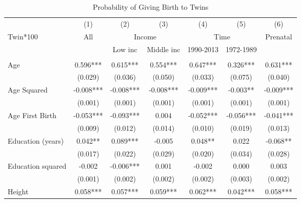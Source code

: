 \begin{landscape}\begin{table}[htpb!] 
\caption{Probability of Giving Birth to Twins} \label{TWINtab:twinreg1} 
\begin{center}\begin{tabular}{lcccccc} \toprule \toprule 
&(1)&(2)&(3)&(4)&(5)&(6)\\
Twin*100&All&\multicolumn{2}{c}{Income}&\multicolumn{2}{c}{Time}&Prenatal\\
 \cmidrule(r){3-4} \cmidrule(r){5-6} 
&&Low inc&Middle inc&1990-2013&1972-1989&\\\midrule
\begin{footnotesize}\end{footnotesize}&\begin{footnotesize}\end{footnotesize}&\begin{footnotesize}\end{footnotesize}&\begin{footnotesize}\end{footnotesize}&\begin{footnotesize}\end{footnotesize}&\begin{footnotesize}\end{footnotesize}&\begin{footnotesize}\end{footnotesize}\\
Age&0.596***&0.615***&0.554***&0.647***&0.326***&0.631***\\
&(0.029)&(0.036)&(0.050)&(0.033)&(0.075)&(0.040)\\
Age Squared&-0.008***&-0.008***&-0.008***&-0.009***&-0.003**&-0.009***\\
&(0.001)&(0.001)&(0.001)&(0.001)&(0.001)&(0.001)\\
Age First Birth&-0.053***&-0.093***&0.004&-0.052***&-0.056***&-0.041***\\
&(0.009)&(0.012)&(0.014)&(0.010)&(0.019)&(0.013)\\
Education (years)&0.042**&0.089***&-0.005&0.048**&0.022&-0.068**\\
&(0.017)&(0.022)&(0.029)&(0.020)&(0.034)&(0.028)\\
Education squared&-0.002&-0.006***&0.001&-0.002&0.000&0.003\\
&(0.001)&(0.002)&(0.002)&(0.002)&(0.003)&(0.002)\\
Height&0.058***&0.057***&0.059***&0.062***&0.042***&0.058***\\

\end{tabular}
\end{center}
\end{table}
\end{landscape}
